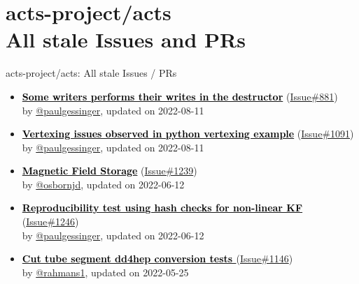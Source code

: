 \documentclass{beamer}
\begin{document}
\section{ acts-project/acts \\ All stale Issues and PRs}
\begin{frame}[allowframebreaks]{ acts-project/acts: All stale Issues / PRs}
  \begin{itemize}
    
    \item
    \textbf{\href{https://github.com/acts-project/acts/issues/881}{\textcolor{black}{Some writers performs their writes in the destructor}}}
    (\href{https://github.com/acts-project/acts/issues/881}{Issue\#881}) \\
    by \href{https://github.com/paulgessinger}{ @paulgessinger}, updated on 2022-08-11

    \item
    \textbf{\href{https://github.com/acts-project/acts/issues/1091}{\textcolor{black}{Vertexing issues observed in python vertexing example}}}
    (\href{https://github.com/acts-project/acts/issues/1091}{Issue\#1091}) \\
    by \href{https://github.com/paulgessinger}{ @paulgessinger}, updated on 2022-08-11

    \item
    \textbf{\href{https://github.com/acts-project/acts/issues/1239}{\textcolor{black}{Magnetic Field Storage}}}
    (\href{https://github.com/acts-project/acts/issues/1239}{Issue\#1239}) \\
    by \href{https://github.com/osbornjd}{ @osbornjd}, updated on 2022-06-12

    \item
    \textbf{\href{https://github.com/acts-project/acts/issues/1246}{\textcolor{black}{Reproducibility test using hash checks for non-linear KF}}}
    (\href{https://github.com/acts-project/acts/issues/1246}{Issue\#1246}) \\
    by \href{https://github.com/paulgessinger}{ @paulgessinger}, updated on 2022-06-12

    \item
    \textbf{\href{https://github.com/acts-project/acts/issues/1146}{\textcolor{black}{Cut tube segment dd4hep conversion tests }}}
    (\href{https://github.com/acts-project/acts/issues/1146}{Issue\#1146}) \\
    by \href{https://github.com/rahmans1}{ @rahmans1}, updated on 2022-05-25


\end{itemize}
\end{frame}
\end{document}
